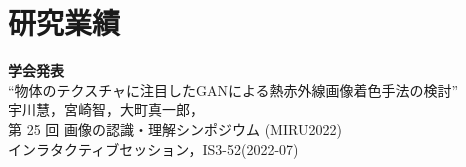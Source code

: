 \chapter*{研究業績}

{\bf 学会発表} \\

\noindent ``物体のテクスチャに注目したGANによる熱赤外線画像着色手法の検討''\\
\noindent 宇川慧，宮崎智，大町真一郎，\\
\noindent 第 25 回 画像の認識・理解シンポジウム (MIRU2022)\\
\noindent インラタクティブセッション，IS3-52(2022-07)\\